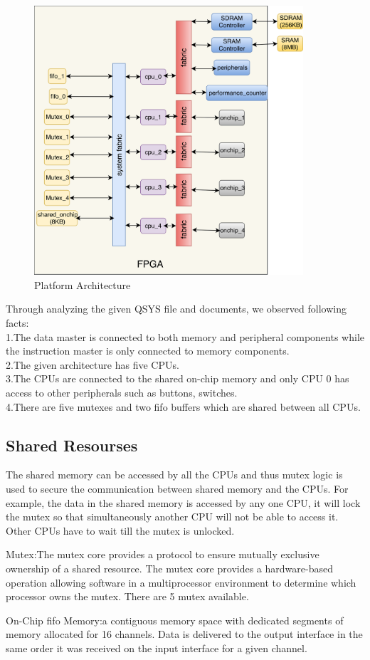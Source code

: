 \documentclass[conference,compsoc]{IEEEtran}
\begin{document}
    \begin{figure}[t]
  \centering
  \includegraphics[width=10cm]{platform.eps}
  \caption{Platform Architecture}	
  \end{figure}
  
  Through analyzing the given QSYS file and documents, we
  observed following facts: \\1.The data master is connected to
  both memory and peripheral components while the instruction
  master is only connected to memory components. \\2.The given
  architecture has five CPUs. \\3.The CPUs are connected to the
  shared on-chip memory and only CPU 0 has access to other
  peripherals such as buttons, switches. \\4.There are five mutexes
  and two fifo buffers which are shared between all CPUs.
  \subsection{Shared Resourses}
  \par The shared memory can be accessed by all the CPUs and
thus mutex logic is used to secure the communication between
shared memory and the CPUs. For example, the data in the
shared memory is accessed by any one CPU, it will lock the
mutex so that simultaneously another CPU will not be able to
access it. Other CPUs have to wait till the mutex is unlocked.
\par Mutex:The mutex core provides a protocol to ensure mutually exclusive ownership of a shared resource. The mutex
core provides a hardware-based operation allowing software
in a multiprocessor environment to determine which processor
owns the mutex. There are 5 mutex available.
\par On-Chip fifo Memory:a contiguous memory space with dedicated segments of memory allocated for 16 channels. Data
is delivered to the output interface in the same order it was
received on the input interface for a given channel.
\end{document}
